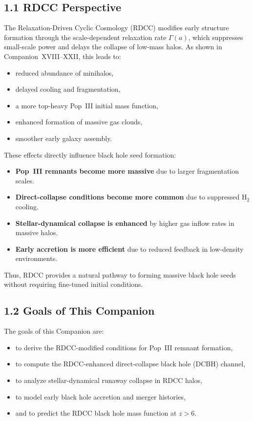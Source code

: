 \documentclass[11pt,a4paper]{article}
\begin{document}
\subsection*{1.1 RDCC Perspective}

The Relaxation-Driven Cyclic Cosmology (RDCC) modifies early structure formation through the 
scale-dependent relaxation rate $\Gamma(a)$, which suppresses small-scale power and delays the 
collapse of low-mass halos. As shown in Companion~XVIII–XXII, this leads to:

\begin{itemize}
    \item reduced abundance of minihalos,
    \item delayed cooling and fragmentation,
    \item a more top-heavy Pop~III initial mass function,
    \item enhanced formation of massive gas clouds,
    \item smoother early galaxy assembly.
\end{itemize}

These effects directly influence black hole seed formation:

\begin{itemize}
    \item \textbf{Pop~III remnants become more massive} due to larger fragmentation scales.
    \item \textbf{Direct-collapse conditions become more common} due to suppressed $\mathrm{H}_2$ cooling.
    \item \textbf{Stellar-dynamical collapse is enhanced} by higher gas inflow rates in massive halos.
    \item \textbf{Early accretion is more efficient} due to reduced feedback in low-density environments.
\end{itemize}

Thus, RDCC provides a natural pathway to forming massive black hole seeds without requiring 
fine-tuned initial conditions.

\subsection*{1.2 Goals of This Companion}

The goals of this Companion are:

\begin{itemize}
    \item to derive the RDCC-modified conditions for Pop~III remnant formation,
    \item to compute the RDCC-enhanced direct-collapse black hole (DCBH) channel,
    \item to analyze stellar-dynamical runaway collapse in RDCC halos,
    \item to model early black hole accretion and merger histories,
    \item and to predict the RDCC black hole mass function at $z > 6$.
\end{itemize}
\end{document}
